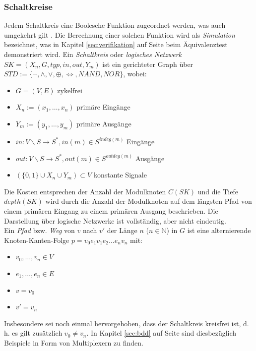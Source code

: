 \subsubsection{Schaltkreise}
\label{sec:schaltkreise}
Jedem Schaltkreis eine Boolesche Funktion zugeordnet werden, was auch umgekehrt gilt \cite{r2007}. Die Berechnung einer solchen Funktion wird als \emph{Simulation} bezeichnet, was in Kapitel \ref{sec:verifikation} auf Seite \pageref{sec:verifikation} beim Äquivalenztest demonstriert wird. Ein \emph{Schaltkreis} oder \emph{logisches Netzwerk} $SK = (X_n, G, typ, in, out, Y_m)$ ist ein gerichteter Graph über $STD := \{ \neg, \wedge, \vee, \oplus, \Leftrightarrow, NAND, NOR \}$, wobei:
\begin{itemize}
	\item $G=(V, E)$ zykelfrei
	\item $X_n := (x_1, \dots, x_n)$ primäre Eingänge
	\item $Y_m := (y_1, \dots, y_m)$ primäre Ausgänge
	\item $in : V \backslash S \rightarrow S^*, in(m) \in S^{indeg(m)}$ Eingänge
	\item $out : V \backslash S \rightarrow S^*, out(m) \in S^{outdeg(m)}$ Ausgänge
	\item $(\{ 0,1 \} \cup X_n \cup Y_m) \subset V$ konstante Signale
\end{itemize}
Die Kosten entsprechen der Anzahl der Modulknoten $C(SK)$ und die Tiefe  $depth(SK)$ wird durch die Anzahl der Modulknoten auf dem längsten Pfad von einem primären Eingang zu einem primären Ausgang beschrieben. Die Darstellung über logische Netzwerke ist vollständig, aber nicht eindeutig.\\
Ein \emph{Pfad} bzw. \emph{Weg} von $v$ nach $v'$ der Länge $n$ ($n \in \mathbb{N}$) in $G$ ist eine alternierende Knoten-Kanten-Folge $p = v_0e_1v_1e_2\dots e_nv_n$ mit:
\begin{itemize}
	\item $v_0, \dots, v_n \in V$
	\item $e_1, \dots, e_n \in E$
	\item $v = v_0$
	\item $v' = v_n$
\end{itemize}
Insbesondere sei noch einmal hervorgehoben, dass der Schaltkreis kreisfrei ist, d.\,h. es gilt zusätzlich $v_0 \neq v_n$. In Kapitel \ref{sec:bdd} auf Seite \pageref{sec:bdd} sind diesbezüglich Beispiele in Form von Multiplexern zu finden.
